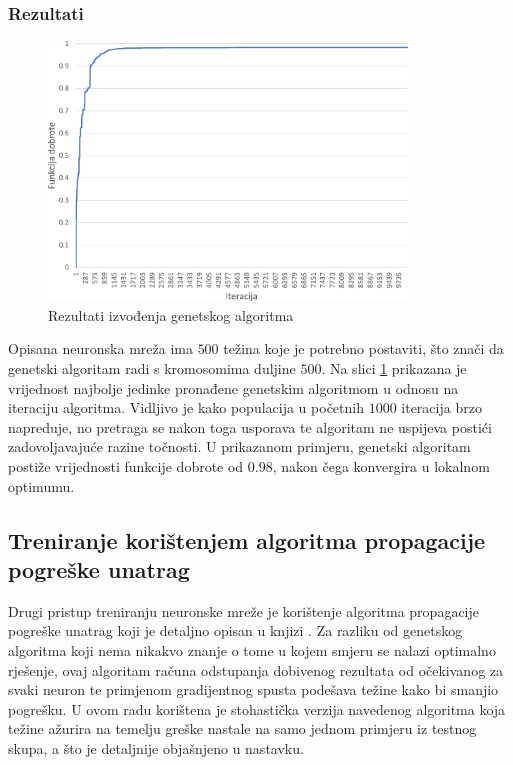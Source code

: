 \documentclass[times, utf8, zavrsni, numeric]{fer}
\begin{document}
\subsubsection{Rezultati}
\begin{figure}[ht!]
    \centering
    \includegraphics[width=0.85\textwidth]{Images/Ga.pdf}
    \captionsetup{justification=centering}
    \caption{Rezultati izvođenja genetskog algoritma}
    \label{fig:ga}
\end{figure}

Opisana neuronska mreža ima $500$ težina koje je potrebno postaviti, što znači da genetski algoritam radi s kromosomima duljine $500$. 
Na slici \ref{fig:ga} prikazana je vrijednost najbolje jedinke pronađene genetskim algoritmom u odnosu na iteraciju algoritma.
Vidljivo je kako populacija u početnih $1000$ iteracija brzo napreduje, no pretraga se nakon toga usporava te algoritam ne uspijeva postići zadovoljavajuće razine točnosti.
U prikazanom primjeru, genetski algoritam postiže vrijednosti funkcije dobrote od $0.98$, nakon čega konvergira u lokalnom optimumu.

\subsection{Treniranje korištenjem algoritma propagacije pogreške unatrag}
Drugi pristup treniranju neuronske mreže je korištenje algoritma propagacije pogreške unatrag koji je detaljno opisan u knjizi \cite{neuroracunarstvo}.
Za razliku od genetskog algoritma koji nema nikakvo znanje o tome u kojem smjeru se nalazi optimalno rješenje, ovaj algoritam računa odstupanja dobivenog rezultata od očekivanog za svaki neuron te primjenom gradijentnog spusta podešava težine kako bi smanjio pogrešku.
U ovom radu korištena je stohastička verzija navedenog algoritma koja težine ažurira na temelju greške nastale na samo jednom primjeru iz testnog skupa, a što je detaljnije objašnjeno u nastavku.
\end{document}
